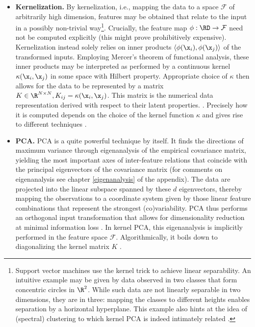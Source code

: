 \begin{itemize}

  \item[] \textbf{Kernelization.} By kernelization, i.e., mapping the data to a 
  space $\mathcal{F}$ of arbitrarily high dimension, features may be obtained 
  that relate to the input in a possibly non-trivial way\footnote{
  Support vector machines use the kernel trick to achieve linear separability. 
  An intuitive example may be given by data observed in two classes that form 
  concentric circles in $\R^2$. 
  While such data are not linearly separable in two dimensions, they are in three: 
  mapping the classes to different heights enables separation by a horizontal 
  hyperplane.
  This example also hints at the idea of (spectral) clustering to which kernel 
  PCA is indeed intimately related \citep{bengioetal2004}.
  }.
  Crucially, the feature map $\phi: \RD \rightarrow \mathcal{F}$ need not be 
  computed explicitly (this might prove prohibitively expensive).
  Kernelization instead solely relies on inner products $\langle \phi(\x_i), 
  \phi(\x_j) \rangle$ of the transformed inputs.
  Employing Mercer's theorem of functional analysis, these inner products may 
  be interpreted as performed by a continuous kernel 
  $\kappa(\x_i, \x_j)$ in some space with Hilbert property.
  Appropriate choice of $\kappa$ then allows for the data to be represented by a 
  matrix $K \in \R^{N \times N}, K_{ij} = \kappa(\x_i, \x_j)$.
  This matrix is the numerical data representation derived with respect to their 
  latent properties. \citep{schoelkopfetal1998}.
  Precisely how it is computed depends on the choice of the kernel function 
  $\kappa$ and gives rise to different techniques \citep{hametal2003}.
  
  \item[] \textbf{PCA.} PCA is a quite powerful technique by itself.
  It finds the directions of maximum variance through eigenanalysis of the 
  empirical covariance matrix, yielding the most important axes of inter-feature 
  relations that coincide with the principal eigenvectors of the covariance 
  matrix (for comments on eigenanalysis see chapter \ref{eigenanalysis} of the 
  appendix).
  The data are projected into the linear subspace spanned by these $d$ 
  eigenvectors, thereby mapping the observations to a coordinate system given 
  by those linear feature combinations that represent the strongest 
  (co)variability.
  PCA thus performs an orthogonal input transformation that allows for 
  dimensionality reduction at minimal information loss \citep{cayton2005}.
  In kernel PCA, this eigenanalysis is implicitly performed in the feature space 
  $\mathcal{F}$.
  Algorithmically, it boils down to diagonalizing the kernel matrix $K$ 
  \citep{schoelkopfetal1998}.
 
\end{itemize}

